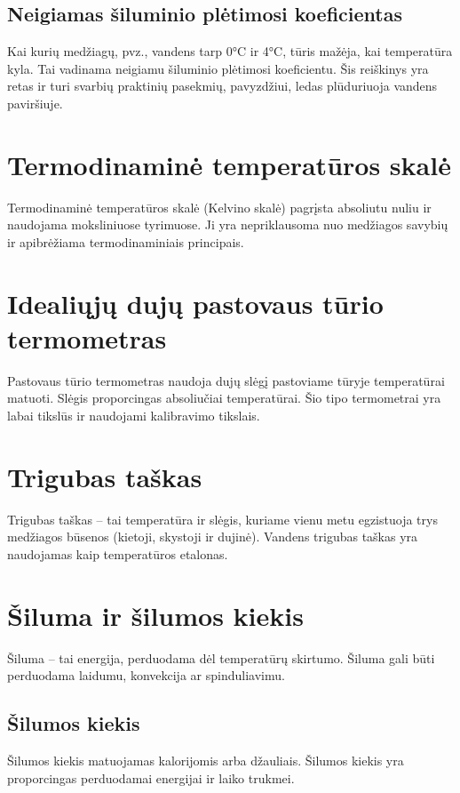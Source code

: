 \documentclass[a4paper,12pt]{article}
\begin{document}
\subsection{Neigiamas šiluminio plėtimosi koeficientas}
Kai kurių medžiagų, pvz., vandens tarp 0°C ir 4°C, tūris mažėja, kai temperatūra kyla. Tai vadinama neigiamu šiluminio plėtimosi koeficientu. Šis reiškinys yra retas ir turi svarbių praktinių pasekmių, pavyzdžiui, ledas plūduriuoja vandens paviršiuje.

\section{Termodinaminė temperatūros skalė}

Termodinaminė temperatūros skalė (Kelvino skalė) pagrįsta absoliutu nuliu ir naudojama moksliniuose tyrimuose. Ji yra nepriklausoma nuo medžiagos savybių ir apibrėžiama termodinaminiais principais.

\section{Idealiųjų dujų pastovaus tūrio termometras}

Pastovaus tūrio termometras naudoja dujų slėgį pastoviame tūryje temperatūrai matuoti. Slėgis proporcingas absoliučiai temperatūrai. Šio tipo termometrai yra labai tikslūs ir naudojami kalibravimo tikslais.

\section{Trigubas taškas}

Trigubas taškas – tai temperatūra ir slėgis, kuriame vienu metu egzistuoja trys medžiagos būsenos (kietoji, skystoji ir dujinė). Vandens trigubas taškas yra naudojamas kaip temperatūros etalonas.

\section{Šiluma ir šilumos kiekis}

Šiluma – tai energija, perduodama dėl temperatūrų skirtumo. Šiluma gali būti perduodama laidumu, konvekcija ar spinduliavimu.

\subsection{Šilumos kiekis}
Šilumos kiekis matuojamas kalorijomis arba džauliais. Šilumos kiekis yra proporcingas perduodamai energijai ir laiko trukmei.
\end{document}
